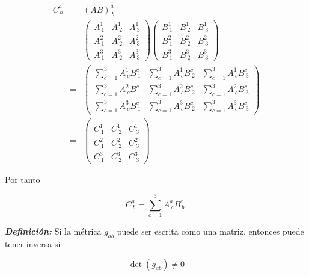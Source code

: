 \documentclass[12pt]{report}
\begin{document}
\begin{eqnarray} \nonumber
C^a_{\ b} &=& (AB)^a_{\ b} \\
&=& 
\left( 
\begin{array}{ccc}
A^1_{\ 1} & A^1_{\ 2} & A^1_{\ 3} \\
A^2_{\ 1} & A^2_{\ 2} & A^2_{\ 3} \\
A^3_{\ 1} & A^3_{\ 2} & A^3_{\ 3}
\end{array}
\right) 
\left( 
\begin{array}{ccc} \nonumber
B^1_{\ 1} & B^1_{\ 2} & B^1_{\ 3} \\
B^2_{\ 1} & B^2_{\ 2} & B^2_{\ 3} \\
B^3_{\ 1} & B^3_{\ 2} & B^3_{\ 3}
\end{array}
\right) 
 \\ \nonumber
&=&
\left( 
\begin{array}{ccc}
\displaystyle \sum_{c=1}^3 A^1_{\ c} B^c_{\ 1} & \displaystyle \sum_{c=1}^3 A^1_{\ c} B^c_{\ 2} & \displaystyle \sum_{c=1}^3 A^1_{\ c} B^c_{\ 3} \\
\displaystyle \sum_{c=1}^3 A^2_{\ c} B^c_{\ 1} & \displaystyle \sum_{c=1}^3 A^2_{\ c} B^c_{\ 2} & \displaystyle \sum_{c=1}^3 A^2_{\ c} B^c_{\ 3} \\
\displaystyle \sum_{c=1}^3 A^3_{\ c} B^c_{\ 1} & \displaystyle \sum_{c=1}^3 A^3_{\ c} B^c_{\ 2} & \displaystyle \sum_{c=1}^3 A^3_{\ c} B^c_{\ 3}
\end{array}
\right) \\
&=&
\left(
\begin{array}{ccc} \\ \nonumber
 C^1_{\ 1} & C^1_{\ 2} & C^1_{\ 3} \\
C^2_{\ 1} & C^2_{\ 2} & C^2_{\ 3} \\
C^3_{\ 1} & C^3_{\ 2} & C^3_{\ 3}
\end{array}
\right)
\end{eqnarray}


Por tanto

\begin{equation} \label{2.67}
C^a_{\ b}=\displaystyle\sum_{c=1}^3 A^a_{\ c} B^c_{\ b}.
\end{equation}


\textbf{\textit{Definición:}}  Si la métrica $g_{ab}$ puede ser escrita como una matriz, entonces puede tener inversa si

\begin{equation} \label{2.68}
\det(g_{ab}) \ne 0
\end{equation}
\end{document}
